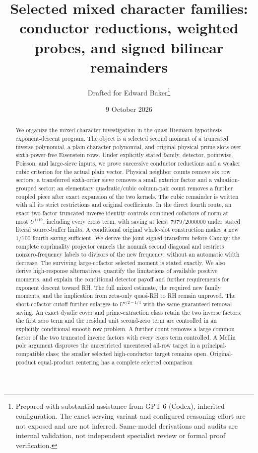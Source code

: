 \documentclass[11pt]{article}
\title{Selected mixed character families:\\conductor reductions, weighted probes, and signed bilinear remainders}
\author{Drafted for Edward Baker\thanks{Prepared with substantial assistance from GPT-6 (Codex), inherited configuration. The exact serving variant and configured reasoning effort are not exposed and are not inferred. Same-model derivations and audits are internal validation, not independent specialist review or formal proof verification.}}
\date{9 October 2026}
\theoremstyle{definition}
\begin{document}
\maketitle
\begin{abstract}
We organize the mixed-character investigation in the quasi-Riemann-hypothesis exponent-descent program. The object is a selected second moment of a truncated inverse polynomial, a plain character polynomial, and original physical prime slots over sixth-power-free Eisenstein rows. Under explicitly stated family, detector, pointwise, Poisson, and large-sieve inputs, we prove successive conductor reductions and a weaker cubic criterion for the actual plain vector. Physical neighbor counts remove six row sectors; a transferred sixth-order sieve removes a small exterior factor and a valuation-grouped sector; an elementary quadratic/cubic column-pair count removes a further coupled piece after exact expansion of the two kernels. The cubic remainder is written with all its strict restrictions and original coefficients. In the direct fourth route, an exact two-factor truncated inverse identity controls combined cofactors of norm at most $U^{1/10}$, including every cross term, with saving at least $7979/2000000$ under stated literal source-buffer limits. A conditional original whole-slot construction makes a new $1/700$ fourth saving sufficient. We derive the joint signed transform before Cauchy: the complete coprimality projector cancels the nonunit second diagonal and restricts nonzero-frequency labels to divisors of the new frequency, without an automatic width decrease. The surviving large-cofactor selected moment is stated exactly. We also derive high-response alternatives, quantify the limitations of available positive moments, and explain the conditional detector payoff and further requirements for exponent descent toward RH. The full mixed estimate, the required new family moments, and the implication from zeta-only quasi-RH to RH remain unproved.
The short-cofactor cutoff further enlarges to $U^{r/2-1/4}$ with the same guaranteed removal saving. An exact dyadic cover and prime-extraction class retain the two inverse factors; the first zero term and the residual unit second-zero term are controlled in an explicitly conditional smooth row problem. A further count removes a large common factor of the two truncated inverse factors with every cross term controlled. A Mellin pole argument disproves the unrestricted uncentered all-row target in a principal-compatible class; the smaller selected high-conductor target remains open.
Original-product equal-product centering has a complete selected comparison

\end{abstract}
\end{document}
